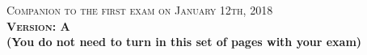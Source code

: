\documentclass{docist}
\begin{document}
\thispagestyle{empty}

\begin{center}
  {\Large \textsc{Companion to the first exam on January 12th, 2018\\[2ex]
  \textbf{Version: A}\\[2ex]}}
  {\normalsize  \textbf{(You do not need to turn in this set of pages with your exam)}}
\end{center}





\qAvailabilityOne



\qPerformanceOne



\qModifiabilityExamOne



\qModuleViewtypeExamOne



\qDecompositionGeneralization



\qComponentAndConnectorViewtypeOne



\qPublishsubscribeOne



\qProxyServer



\qGraphiteOne



\qDVDOne



\qAdventureBuilderOne



\qPulseOne



\qOrderPadOne



\qLayered


\qDynamicReconfiguration



\qDeployment



\qWebAppsOne



\qFenixOne



\qAggregateOne



\qMicroservicesExamOne
\end{document}
